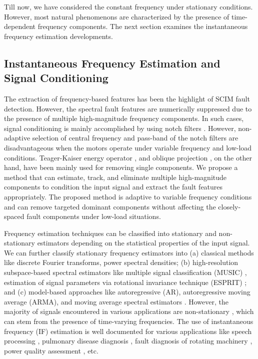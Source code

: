 Till now, we have considered the constant frequency under stationary conditions. However, most natural phenomenons are characterized by the presence of time-dependent frequency components. The next section examines the instantaneous frequency estimation developments.  

\subsection{Instantaneous Frequency Estimation and Signal Conditioning}
The extraction of frequency-based features has been the highlight of SCIM fault detection. However, the spectral fault features are numerically suppressed due to the presence of multiple high-magnitude frequency components. In such cases, signal conditioning is mainly accomplished by using notch filters \cite{ayhan2008use}. However, non-adaptive selection of central frequency and pass-band of the notch filters are disadvantageous when the motors operate under variable frequency and low-load conditions. Teager-Kaiser energy operator \cite{pineda2013application}, and oblique projection \cite{elbouchikhi2017motor}, on the other hand, have been mainly used for removing single components. We propose a method that can estimate, track, and eliminate multiple high-magnitude components to condition the input signal and extract the fault features appropriately. The proposed method is adaptive to variable frequency conditions and can remove targeted dominant components without affecting the closely-spaced fault components under low-load situations.

Frequency estimation techniques can be classified into stationary and non-stationary estimators depending on the statistical properties of the input signal. We can further classify stationary frequency estimators \cite{kay1988modern} into (a) classical methods like discrete Fourier transforms, power spectral densities; (b) high-resolution subspace-based spectral estimators like multiple signal classification (MUSIC) \cite{schmidt1986multiple}, estimation of signal parameters via rotational invariance technique (ESPRIT) \cite{roy1989esprit}; and (c) model-based approaches like autoregressive (AR), autoregressive moving average (ARMA), and moving average spectral estimators \cite{kay1988modern}. However, the majority of signals encountered in various applications are non-stationary \cite{hlawatsch2013time}, which can stem from the presence of time-varying frequencies. The use of instantaneous frequency (IF) estimation is well documented for various applications like speech processing \cite{kortlang2016auditory}, pulmonary disease diagnosis \cite{lozano2016automatic}, fault diagnosis of rotating machinery \cite{wang2018matching}, power quality assessment \cite{Chen2010}, etc. 

